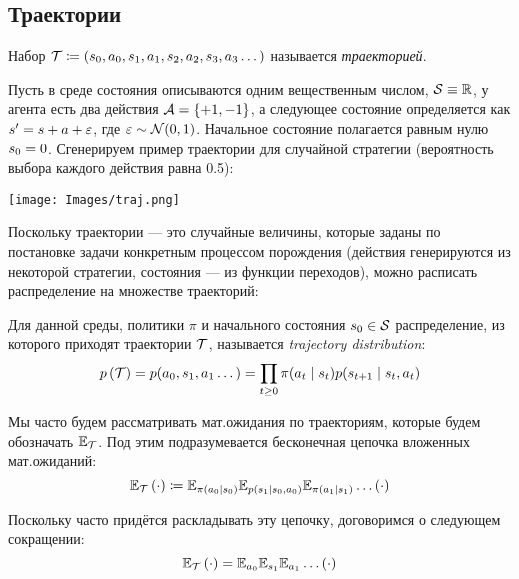\subsection{Траектории}

\begin{definition} 
Набор $\mathcal{T} \coloneqq \left( s_0, a_0, s_1, a_1, s_2, a_2, s_3, a_3 \dots \right) $ называется \emph{траекторией}.
\end{definition}

\begin{exampleBox}[label=ex:trajectory]{}
Пусть в среде состояния описываются одним вещественным числом, $\St \HM\equiv \R$, у агента есть два действия $\A \HM= \{+1, -1\}$, а следующее состояние определяется как $s' \HM= s + a + \eps$, где $\varepsilon \sim \mathcal{N}(0, 1)$. Начальное состояние полагается равным нулю $s_0 \HM= 0$. Сгенерируем пример траектории для случайной стратегии (вероятность выбора каждого действия равна 0.5):
    \begin{center}
    \texttt{[image: Images/traj.png]}
    \end{center}
\end{exampleBox}

Поскольку траектории --- это случайные величины, которые заданы по постановке задачи конкретным процессом порождения (действия генерируются из некоторой стратегии, состояния --- из функции переходов), можно расписать распределение на множестве траекторий:

\begin{definition} 
Для данной среды, политики $\pi$ и начального состояния $s_0 \HM\in \St$ распределение, из которого приходят траектории $\mathcal{T}$, называется \emph{trajectory distribution}:
$$p\left(\mathcal{T} \right) = p(a_0, s_1, a_1 \dots) = \prod_{t \ge 0} \pi(a_t \mid s_t) p(s_{t+1} \mid s_t, a_t)$$
\end{definition}

Мы часто будем рассматривать мат.ожидания по траекториям, которые будем обозначать $\mathbb{E}_{\mathcal{T}}$. Под этим подразумевается бесконечная цепочка вложенных мат.ожиданий:
\begin{equation}\label{traj_expectation}
\mathbb{E}_{\mathcal{T}} \left( \cdot \right) \coloneqq \mathbb{E}_{\pi(a_0 \mid s_0)}\mathbb{E}_{p(s_1 \mid s_0, a_0)}\mathbb{E}_{\pi(a_1 \mid s_1)} \dots \left( \cdot \right)
\end{equation}

Поскольку часто придётся раскладывать эту цепочку, договоримся о следующем сокращении:
$$\mathbb{E}_{\mathcal{T}} \left( \cdot \right) = \mathbb{E}_{a_0}\mathbb{E}_{s_1}\mathbb{E}_{a_1} \dots \left( \cdot \right)$$

